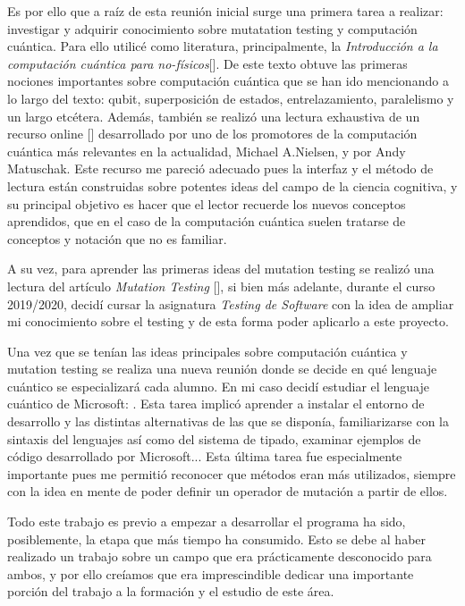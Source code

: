 Es por ello que a raíz de esta reunión inicial surge una primera tarea a realizar: investigar y adquirir conocimiento sobre mutatation testing y computación cuántica. Para ello utilicé como literatura, principalmente, la \textit{Introducción a la computación cuántica para no-físicos}[\cite{rieffel2000introduction}]. De este texto obtuve las primeras nociones importantes sobre computación cuántica que se han ido mencionando a lo largo del texto: qubit, superposición de estados, entrelazamiento, paralelismo y un largo etcétera. Además, también se realizó una lectura exhaustiva de un recurso online [\cite{quantumcountry}] desarrollado por uno de los promotores de la computación cuántica más relevantes en la actualidad, Michael A.Nielsen, y por Andy Matuschak. Este recurso me pareció adecuado pues la interfaz y el método de lectura están construidas sobre potentes ideas del campo de la ciencia cognitiva, y su principal objetivo es hacer que el lector recuerde los nuevos conceptos aprendidos, que en el caso de la computación cuántica suelen tratarse de conceptos y notación que no es familiar.

A su vez, para aprender las primeras ideas del mutation testing se realizó una lectura del artículo \textit{Mutation Testing} [\cite{hierons2010mutation}], si bien más adelante, durante el curso 2019/2020,  decidí cursar la asignatura \textit{Testing de Software} con la idea de ampliar mi conocimiento sobre el testing y de esta forma poder aplicarlo a este proyecto.

Una vez que se tenían las ideas principales sobre computación cuántica y mutation testing se realiza una nueva reunión donde se decide en qué lenguaje cuántico se especializará cada alumno. En mi caso decidí estudiar el lenguaje cuántico de Microsoft: \qsh. Esta tarea implicó aprender a instalar el entorno de desarrollo y las distintas alternativas de las que se disponía, familiarizarse con la sintaxis del lenguajes así como del sistema de tipado, examinar ejemplos de código desarrollado por Microsoft... Esta última tarea fue especialmente importante pues me permitió reconocer que métodos eran más utilizados, siempre con la idea en mente de poder definir un operador de mutación a partir de ellos.

Todo este trabajo es previo a empezar a desarrollar el programa ha sido, posiblemente, la etapa que más tiempo ha consumido. Esto se debe al haber realizado un trabajo sobre un campo que era prácticamente desconocido para ambos, y por ello creíamos que era imprescindible dedicar una importante porción del trabajo a la formación y el estudio de este área.

